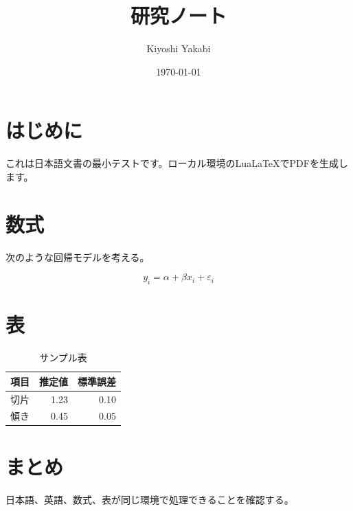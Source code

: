 \documentclass[11pt]{ltjsarticle}
\title{研究ノート}
\author{Kiyoshi Yakabi}
\date{\today}
\begin{document}
\maketitle

\section{はじめに}

これは日本語文書の最小テストです。ローカル環境のLuaLaTeXでPDFを生成します。

\section{数式}

次のような回帰モデルを考える。

\[
  y_i = \alpha + \beta x_i + \varepsilon_i
\]

\section{表}

\begin{table}[h]
\centering
\begin{tabular}{lrr}
\toprule
項目 & 推定値 & 標準誤差 \\
\midrule
切片 & 1.23 & 0.10 \\
傾き & 0.45 & 0.05 \\
\bottomrule
\end{tabular}
\caption{サンプル表}
\end{table}

\section{まとめ}

日本語、英語、数式、表が同じ環境で処理できることを確認する。
\end{document}
